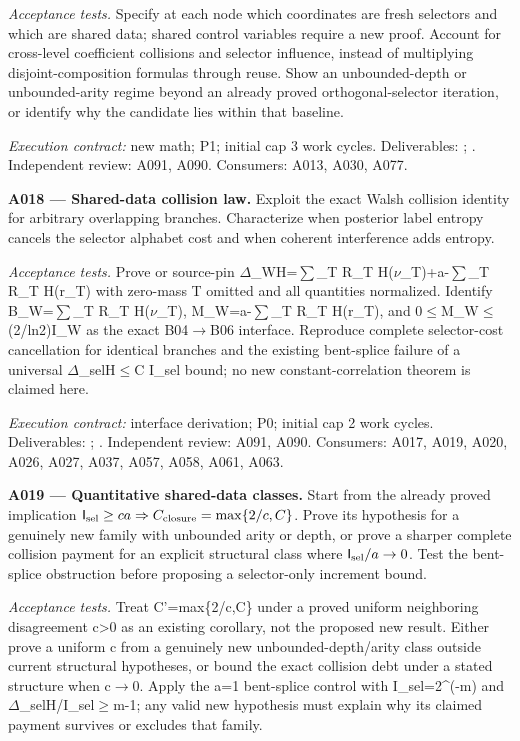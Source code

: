 \documentclass[11pt]{article}
\begin{document}
\emph{Acceptance tests.} Specify at each node which coordinates are fresh selectors and which are shared data; shared control variables require a new proof. Account for cross-level coefficient collisions and selector influence, instead of multiplying disjoint-composition formulas through reuse. Show an unbounded-depth or unbounded-arity regime beyond an already proved orthogonal-selector iteration, or identify why the candidate lies within that baseline.

{\small\emph{Execution contract:} new math; P1; initial cap 3 work cycles. Deliverables: ; . Independent review: A091, A090. Consumers: A013, A030, A077.}

\textbf{A018 --- Shared-data collision law.} Exploit the exact Walsh collision identity for arbitrary overlapping branches. Characterize when posterior label entropy cancels the selector alphabet cost and when coherent interference adds entropy.

\emph{Acceptance tests.} Prove or source-pin $\Delta$\_WH=$\sum$\_T R\_T H($\nu$\_T)+a-$\sum$\_T R\_T H(r\_T) with zero-mass T omitted and all quantities normalized. Identify B\_W=$\sum$\_T R\_T H($\nu$\_T), M\_W=a-$\sum$\_T R\_T H(r\_T), and 0$\le$M\_W$\le$(2/ln2)I\_W as the exact B04$\to$B06 interface. Reproduce complete selector-cost cancellation for identical branches and the existing bent-splice failure of a universal $\Delta$\_selH$\le$C I\_sel bound; no new constant-correlation theorem is claimed here.

{\small\emph{Execution contract:} interface derivation; P0; initial cap 2 work cycles. Deliverables: ; . Independent review: A091, A090. Consumers: A017, A019, A020, A026, A027, A037, A057, A058, A061, A063.}

\textbf{A019 --- Quantitative shared-data classes.} Start from the already proved implication $\mathsf I_{\rm sel}\ge ca\Rightarrow C_{\rm closure}=\max\{2/c,C\}$. Prove its hypothesis for a genuinely new family with unbounded arity or depth, or prove a sharper complete collision payment for an explicit structural class where $\mathsf I_{\rm sel}/a\to0$. Test the bent-splice obstruction before proposing a selector-only increment bound.

\emph{Acceptance tests.} Treat C'=max\{2/c,C\} under a proved uniform neighboring disagreement c>0 as an existing corollary, not the proposed new result. Either prove a uniform c from a genuinely new unbounded-depth/arity class outside current structural hypotheses, or bound the exact collision debt under a stated structure when c$\to$0. Apply the a=1 bent-splice control with I\_sel=2\textasciicircum{}(-m) and $\Delta$\_selH/I\_sel$\ge$m-1; any valid new hypothesis must explain why its claimed payment survives or excludes that family.
\end{document}
